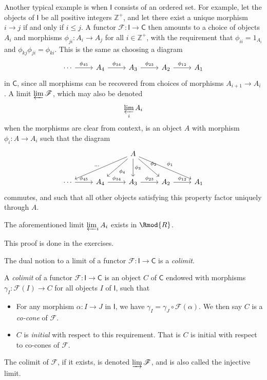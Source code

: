 Another typical example is when $\mathsf{I} $ consists of an ordered set. For example, let the objects of $\mathsf{I} $ be all positive integers $\mathbb{Z} ^+$, and let there exist a unique morphism $i\to j$ if and only if $i\leq j$. A functor $\mathscr{F} : \mathsf{I}  \to \mathsf{C} $ then amounts to a choice of objects $A_i$ and morphisms $\phi_{ji} : A_i \to A_j$ for all $i\in\mathbb{Z} ^+$, with the requirement that $\phi_{ii} =1_{A_i} $ and $\phi_{kj} \phi _{ji} =\phi _{ki} $. This is the same as choosing a diagram
\[\begin{tikzcd}[row sep = 2.5em, column sep = 2.5em]
	\cdots \arrow[r, "\phi_{45} "]&A_4\arrow[r, "\phi_{34} "]&A_3\arrow[r, "\phi_{23} "]&A_2\arrow[r, "\phi_{12} "]&A_1
\end{tikzcd}\]
in $\mathsf{C} $, since all morphisms can be recovered from choices of morphisms $A_{i+1} \to A_i$. A limit $\varprojlim \mathscr{F} $, which may also be denoted
\[
	\varprojlim_{i}  A_i
\]
when the morphisms are clear from context, is an object $A$ with morphism $\phi_i : A \to A_i$ such that the diagram
\[\begin{tikzcd}[row sep = 2.5em, column sep = 2.5em]
	&&A\arrow[dll, "\ldots "']\arrow[dl, "\phi_4"]\arrow[d, "\phi_3"]\arrow[dr, "\phi _2"]\arrow[drr, "\phi _1"]\\
	\cdots \arrow[r, "\phi_{45} "]&A_4\arrow[r, "\phi_{34} "]&A_3\arrow[r, "\phi_{23} "]&A_2\arrow[r, "\phi_{12} "]&A_1
\end{tikzcd}\]
commutes, and such that all other objects satisfying this property factor uniquely through $A$.

\begin{claim}
	The aforementioned limit $\varprojlim_i A_i$ exists in $\Rmod{R} $.
\end{claim}
This proof is done in the exercises.

The dual notion to a limit of a functor $\mathscr{F} : \mathsf{I}  \to \mathsf{C} $ is a \emph{colimit}.
\begin{definition}[Colimit]\label{dfn:8.5}
	A \emph{colimit} of a functor $\mathscr{F} : \mathsf{I}  \to \mathsf{C} $ is an object $C$ of $\mathsf{C} $ endowed with morphisms $\gamma_I : \mathscr{F} (I) \to C$ for all objects $I$ of $\mathsf{I} $, such that
	\begin{itemize}
		\item For any morphism $\alpha  : I \to J$ in $\mathsf{I} $, we have $\gamma_I=\gamma_J \circ \mathscr{F} (\alpha )$. We then say $C$ is a \emph{co-cone} of $\mathscr{F} $.
		\item $C$ is \emph{initial} with respect to this requirement. That is $C$ is initial with respect to co-cones of $\mathscr{F} $.
	\end{itemize}
\end{definition}
The colimit of $\mathscr{F} $, if it exists, is denoted $\varinjlim \mathscr{F} $, and is also called the injective limit.

